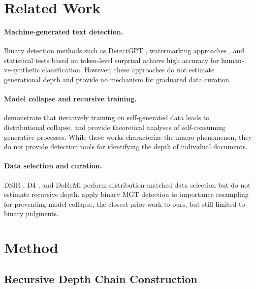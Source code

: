 \documentclass[11pt]{article}
\begin{document}
\section{Related Work}

\paragraph{Machine-generated text detection.} Binary detection methods such as DetectGPT \citep{mitchell2023detectgpt}, watermarking approaches \citep{kirchenbauer2023watermark}, and statistical tests based on token-level surprisal \citep{su2023detectllm} achieve high accuracy for human-vs-synthetic classification. However, these approaches do not estimate generational depth and provide no mechanism for graduated data curation.

\paragraph{Model collapse and recursive training.} \citet{shumailov2024model} demonstrate that iteratively training on self-generated data leads to distributional collapse. \citet{alemohammad2024selfconsuming} and \citet{dohmatob2024tale} provide theoretical analyses of self-consuming generative processes. While these works characterize the macro phenomenon, they do not provide detection tools for identifying the depth of individual documents.

\paragraph{Data selection and curation.} DSIR \citep{xie2023dsir}, D4 \citep{tirumala2024d4}, and DoReMi \citep{xie2024doremi} perform distribution-matched data selection but do not estimate recursive depth. \citet{drayson2025contamination} apply binary MGT detection to importance resampling for preventing model collapse, the closest prior work to ours, but still limited to binary judgments.

\section{Method}
\label{sec:method}

\subsection{Recursive Depth Chain Construction}
\end{document}
